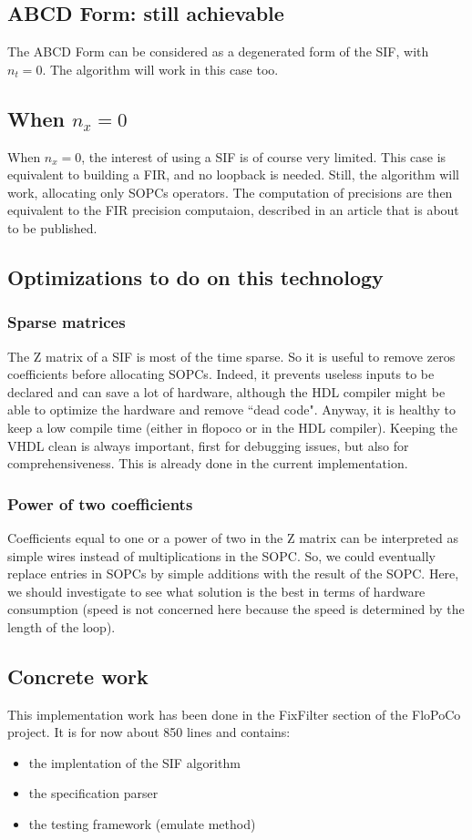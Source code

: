 	\subsection{ABCD Form: still achievable}
	The ABCD Form can be considered as a degenerated form of the SIF, with $n_t=0$.
	The algorithm will work in this case too.
	\subsection{When $n_x=0$}
	When $n_x=0$, the interest of using a SIF is of course very limited.
	This case is equivalent to building a FIR, and no loopback is needed.
	Still, the algorithm will work, allocating only SOPCs operators.
	The computation of precisions are then equivalent to the FIR precision computaion, described in an article that is about to be published.
	
\subsection{Optimizations to do on this technology}
	\subsubsection{Sparse matrices}
		The Z matrix of a SIF is most of the time sparse.
		So it is useful to remove zeros coefficients before allocating SOPCs.
		Indeed, it prevents useless inputs to be declared and can save a lot of hardware,
		although the HDL compiler might be able to optimize the hardware and remove ``dead code".
		Anyway, it is healthy to keep a low compile time (either in flopoco or in the HDL compiler).
		Keeping the VHDL clean is always important, first for debugging issues, but also for comprehensiveness.
		This is already done in the current implementation.

	\subsubsection{Power of two coefficients}
		Coefficients equal to one or a power of two in the Z matrix can be interpreted as simple wires instead of multiplications in the SOPC.
		So, we could eventually replace entries in SOPCs by simple additions with the result of the SOPC.
		Here, we should investigate to see what solution is the best in terms of hardware consumption
		(speed is not concerned here because the speed is determined by the length of the loop).

	\subsection{Concrete work}
	This implementation work has been done in the FixFilter section of the FloPoCo project.
	It is for now about 850 lines and contains:
	\begin{itemize}
		\item the implentation of the SIF algorithm
		\item the specification parser
		\item the testing framework (emulate method)
	\end{itemize}

